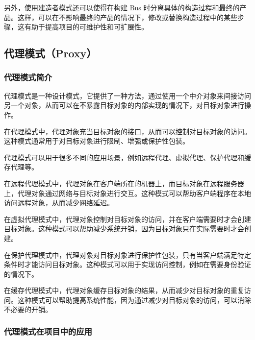 \documentclass[cn,black,12pt,normal]{elegantnote}
\begin{document}
另外，使用建造者模式还可以使得在构建 Bus 时分离具体的构造过程和最终的产品。这样，可以在不影响最终的产品的情况下，修改或替换构造过程中的某些步骤，这有助于提高项目的可维护性和可扩展性。


\subsection{代理模式（Proxy）}

\subsubsection{代理模式简介}

代理模式是一种设计模式，它提供了一种方法，通过使用一个中介对象来间接访问另一个对象，从而可以在不暴露目标对象的内部实现的情况下，对目标对象进行操作。

在代理模式中，代理对象充当目标对象的接口，从而可以控制对目标对象的访问。这种模式通常用于对目标对象进行限制、增强或保护性包装。

代理模式可以用于很多不同的应用场景，例如远程代理、虚拟代理、保护代理和缓存代理等。

在远程代理模式中，代理对象在客户端所在的机器上，而目标对象在远程服务器上，代理对象通过网络与目标对象进行交互。这种模式可以帮助客户端程序在本地访问远程对象，从而减少网络延迟。

在虚拟代理模式中，代理对象控制对目标对象的访问，并在客户端需要时才会创建目标对象。这种模式可以帮助减少系统开销，因为目标对象只在实际需要时才会创建。

在保护代理模式中，代理对象对目标对象进行保护性包装，只有当客户端满足特定条件时才能访问目标对象。这种模式可以用于实现访问控制，例如在需要身份验证的情况下。

在缓存代理模式中，代理对象缓存目标对象的结果，从而减少对目标对象的重复访问。这种模式可以帮助提高系统性能，因为通过减少对目标对象的访问，可以消除不必要的开销。

\subsubsection{代理模式在项目中的应用}
\end{document}
